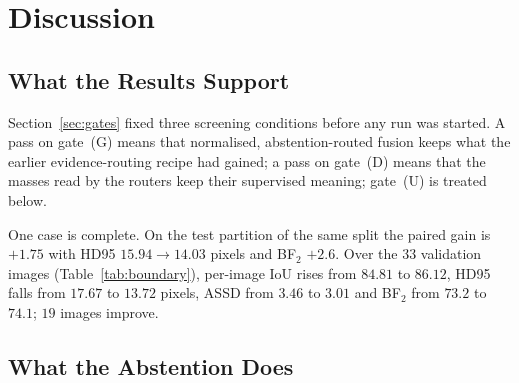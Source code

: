 \section{Discussion}
\label{sec:discussion}

\subsection{What the Results Support}

Section~\ref{sec:gates} fixed three screening conditions before any run was started. A pass on gate~(G) means that normalised, abstention-routed fusion keeps what the earlier evidence-routing recipe had gained; a pass on gate~(D) means that the masses read by the routers keep their supervised meaning; gate~(U) is treated below.

One case is complete.  On the test partition of the same split the paired gain is $+1.75$ with HD95 $15.94\to14.03$ pixels and BF$_2$ $+2.6$. Over the $33$ validation images (Table~\ref{tab:boundary}), per-image IoU rises from $84.81$ to $86.12$, HD95 falls from $17.67$ to $13.72$ pixels, ASSD from $3.46$ to $3.01$ and BF$_2$ from $73.2$ to $74.1$; $19$ images improve. 

\subsection{What the Abstention Does}

